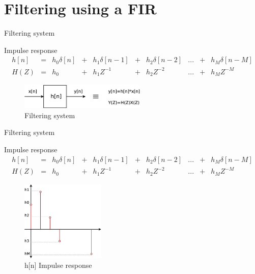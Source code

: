 \documentclass[envcountsect,dvips]{beamer}
\begin{document}
\section{Filtering using a FIR}
\begin{frame}{Filtering  system}
\begin{block}{Impulse response}
\tiny
\begin{equation}
\begin{matrix}
h[n] & = & h_0 \delta[n] &+& h_1\delta[n-1] &+& h_2\delta[n-2] &... &+& h_M \delta[n-M]\\
H(Z) & = & h_0           &+& h_1Z^{-1}      &+& h_2 Z^{-2}     &... &+& h_M Z^{-M} 
\end{matrix}
\end{equation}
\normalsize
\end{block}
\begin{figure}[!htb]
\centering
\includegraphics[width=6cm]{images/system.eps}
\caption{Filtering  system}
\label{fig:system}
\end{figure} 
\end{frame}
\begin{frame}{Filtering  system}
\begin{block}{Impulse response}
\tiny
\begin{equation}
\begin{matrix}
h[n] & = & h_0 \delta[n] &+& h_1\delta[n-1] &+& h_2\delta[n-2] &... &+& h_M \delta[n-M]\\
H(Z) & = & h_0           &+& h_1Z^{-1}      &+& h_2 Z^{-2}     &... &+& h_M Z^{-M} 
\end{matrix}
\end{equation}
\normalsize
\end{block}
\begin{figure}[!htb]
\centering
\includegraphics[width=4cm]{images/response.eps}
\caption{h[n] Impulse response}
\label{fig:system}
\end{figure} 
\end{frame}
\end{document}
